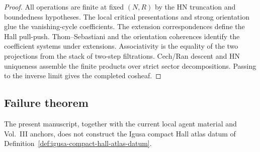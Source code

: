 \begin{proof}
All operations are finite at fixed \((N,R)\) by the HN truncation and
boundedness hypotheses.  The local critical presentations and strong
orientation glue the vanishing-cycle coefficients.  The extension
correspondences define the Hall pull-push.  Thom--Sebastiani and the
orientation coherences identify the coefficient systems under
extensions.  Associativity is the equality of the two projections from
the stack of two-step filtrations.  Cech/Ran descent and HN uniqueness
assemble the finite products over strict sector decompositions.  Passing
to the inverse limit gives the completed cosheaf.
\end{proof}

\subsection{Failure theorem}

\begin{theorem}
\label{thm:k3e-atlas-not-yet-constructed}
The present manuscript, together with the current local agent material
and Vol.~III anchors, does not construct the Igusa compact Hall atlas
datum of Definition~\ref{def:igusa-compact-hall-atlas-datum}.
\end{theorem}

